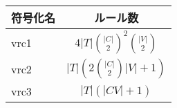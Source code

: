 \begingroup
\renewcommand{\arraystretch}{1.5}
\begin{tabular}{l|c}\hline
  符号化名 & ルール数 \\ \hline
  vrc1 & $4|T|{|C|\choose 2}^{2}{|V|\choose 2}$ \\ \hline
  vrc2 & $|T|\left(2{|C|\choose 2}|V| + 1\right)$ \\ \hline
  vrc3 & $|T|(|CV| + 1)$ \\ \hline
\end{tabular}
\endgroup